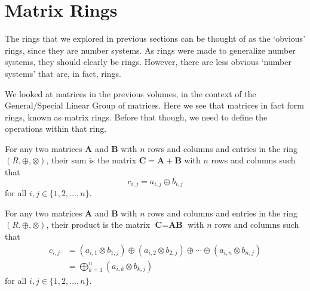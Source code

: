 \section{Matrix Rings}
The rings that we explored in previous sections can be thought of as the `obvious' rings, since they are number systems. As rings were made to generalize number systems, they should clearly be rings. However, there are less obvious `number systems' that are, in fact, rings.

We looked at matrices in the previous volumes, in the context of the General/Special Linear Group of matrices. Here we see that matrices in fact form rings, known as matrix rings. Before that though, we need to define the operations within that ring.

\begin{definition}
    For any two matrices $\textbf{A}$ and $\textbf{B}$ with $n$ rows and columns and entries in the ring $(R, \oplus, \otimes)$, their sum is the matrix $\textbf{C} = \textbf{A} + \textbf{B}$ with $n$ rows and columns such that
    \[
        c_{i,j} = a_{i,j} \oplus b_{i,j}
    \]
    for all $i,j \in \{1, 2, \dots, n\}$.
\end{definition}
\begin{definition}
    For any two matrices $\textbf{A}$ and $\textbf{B}$ with $n$ rows and columns and entries in the ring $(R, \oplus, \otimes)$, their product is the matrix $\textbf{C} = \textbf{AB}$ with $n$ rows and columns such that
    \begin{align*}
        c_{i,j} &= (a_{i,1}\otimes b_{1,j}) \oplus (a_{i,2}\otimes b_{2,j}) \oplus \cdots \oplus (a_{i,n}\otimes b_{n,j})\\
        &= \bigoplus_{k=1}^n (a_{i,k}\otimes b_{k,j})
    \end{align*}
    for all $i,j \in \{1, 2, \dots, n\}$.
\end{definition}

